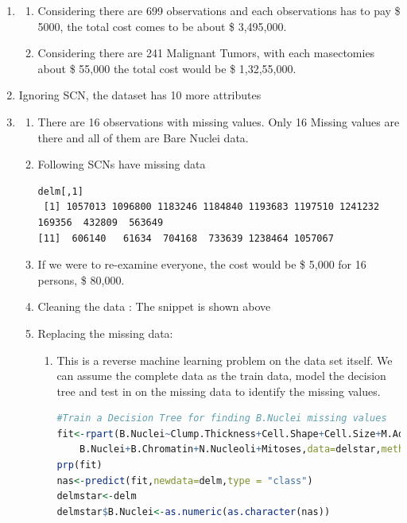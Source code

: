 \documentclass{article}
\begin{document}
\begin{enumerate}
\item
\begin{enumerate}
\item Considering there are 699 observations and each observations has to pay \$ 5000, the total cost comes to be about \$ 3,495,000.
\item Considering there are 241 Malignant Tumors, with each masectomies about \$ 55,000 the total cost would be \$  1,32,55,000.
\end{enumerate}
\item Ignoring SCN, the dataset has 10 more attributes
\item
\begin{enumerate}
\item There are 16 observations with missing values. Only 16 Missing values are there and all of them are Bare Nuclei data.
\item Following SCNs have missing data
\begin{verbatim}
delm[,1]
 [1] 1057013 1096800 1183246 1184840 1193683 1197510 1241232  169356  432809  563649
[11]  606140   61634  704168  733639 1238464 1057067
\end{verbatim}
\item If we were to re-examine everyone, the cost would be \$ 5,000 for 16 persons, \$ 80,000.
\item Cleaning the data : The snippet is shown above
\item Replacing the missing data:
\begin{enumerate}
\item This is a reverse machine learning problem on the data set itself. We can assume the complete data as the train data, model the decision tree and test in on the missing data to identify the missing values.
\begin{lstlisting}[language=R]
#Train a Decision Tree for finding B.Nuclei missing values
fit<-rpart(B.Nuclei~Clump.Thickness+Cell.Shape+Cell.Size+M.Adhesion+SECS+
	B.Nuclei+B.Chromatin+N.Nucleoli+Mitoses,data=delstar,method = "class")
prp(fit)
nas<-predict(fit,newdata=delm,type = "class")
delmstar<-delm
delmstar$B.Nuclei<-as.numeric(as.character(nas))


\end{lstlisting}
\end{enumerate}
\end{enumerate}
\end{enumerate}
\end{document}
